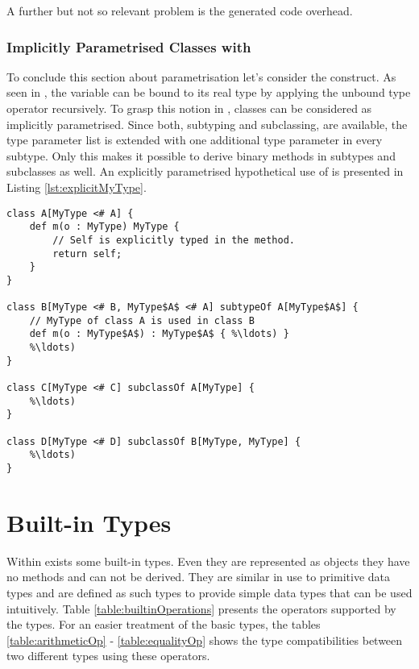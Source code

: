 A further but not so relevant problem is the generated code overhead.

\subsubsection{Implicitly Parametrised Classes with \mytype}
\label{sec:implicitlyMyType}
To conclude this section about parametrisation let's consider the
\mytype construct. As seen in , the
\self variable can be bound to its real type by applying the unbound
type operator recursively. To grasp this notion in \ooplss, classes
can be considered as implicitly parametrised. Since both, subtyping
and subclassing, are available, the type parameter list is extended
with one additional type parameter in every subtype. Only this makes it
possible to derive binary methods in subtypes and subclasses as well. An
explicitly parametrised hypothetical use of \mytype is presented in
Listing \ref{lst:explicitMyType}.

\begin{lstlisting}[language=ooplss,caption=Explicit \mytype parametrisation,label=lst:explicitMyType]
class A[MyType <# A] {
	def m(o : MyType) MyType {
		// Self is explicitly typed in the method.
		return self;
	}
}

class B[MyType <# B, MyType$A$ <# A] subtypeOf A[MyType$A$] {
	// MyType of class A is used in class B
	def m(o : MyType$A$) : MyType$A$ { %\ldots) }
	%\ldots)
}

class C[MyType <# C] subclassOf A[MyType] {
	%\ldots)
}

class D[MyType <# D] subclassOf B[MyType, MyType] {
	%\ldots)
}
\end{lstlisting}

\section{Built-in Types}
\label{sec:builtinTypes}
Within \ooplss exists some built-in types. Even they are represented
as objects they have no methods and can not be derived. They are
similar in use to primitive data types and are defined as such types
to provide simple data types that can be used intuitively. Table
\ref{table:builtinOperations} presents the operators supported by
the types. For an easier treatment of the basic types, the tables
\ref{table:arithmeticOp} - \ref{table:equalityOp} shows the type
compatibilities between two different types using these operators.

